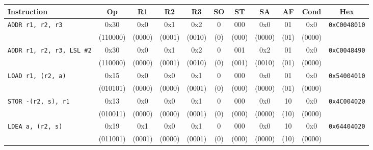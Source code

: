 \begin{table}[H]
	\centering
	\footnotesize
	\setlength{\tabcolsep}{2.5pt}
	\begin{tabular}{lcccccccccc}
		\toprule
		\textbf{Instruction}                & \textbf{Op} & \textbf{R1} & \textbf{R2} & \textbf{R3} & \textbf{SO} & \textbf{ST} & \textbf{SA} & \textbf{AF} & \textbf{Cond} & \textbf{Hex}        \\
		\midrule
		\texttt{ADDR r1, r2, r3}            & 0x30        & 0x0         & 0x1         & 0x2         & 0           & 000         & 0x0         & 01          & 0x0           & \texttt{0xC0048010} \\
		                                    & (110000)    & (0000)      & (0001)      & (0010)      & (0)         & (000)       & (0000)      & (01)        & (0000)        &                     \\
		\midrule
		\texttt{ADDR r1, r2, r3, LSL \#2}   & 0x30        & 0x0         & 0x1         & 0x2         & 0           & 001         & 0x2         & 01          & 0x0           & \texttt{0xC0048490} \\
		                                    & (110000)    & (0000)      & (0001)      & (0010)      & (0)         & (001)       & (0010)      & (01)        & (0000)        &                     \\
		\midrule
		\texttt{LOAD r1, (r2, a)}           & 0x15        & 0x0         & 0x0         & 0x1         & 0           & 000         & 0x0         & 01          & 0x0           & \texttt{0x54004010} \\
		                                    & (010101)    & (0000)      & (0000)      & (0001)      & (0)         & (000)       & (0000)      & (01)        & (0000)        &                     \\
		\midrule
		\texttt{STOR -(r2, s), r1}          & 0x13        & 0x0         & 0x0         & 0x1         & 0           & 000         & 0x0         & 10          & 0x0           & \texttt{0x4C004020} \\
		                                    & (010011)    & (0000)      & (0000)      & (0001)      & (0)         & (000)       & (0000)      & (10)        & (0000)        &                     \\
		\midrule
		\texttt{LDEA a, (r2, s)}            & 0x19        & 0x1         & 0x0         & 0x1         & 0           & 000         & 0x0         & 10          & 0x0           & \texttt{0x64404020} \\
		                                    & (011001)    & (0001)      & (0000)      & (0001)      & (0)         & (000)       & (0000)      & (10)        & (0000)        &                     \\

\end{tabular}
\end{table}
